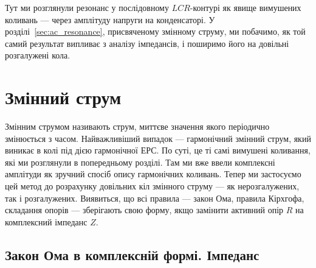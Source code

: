 Тут ми розглянули резонанс у послідовному $LCR$-контурі як явище вимушених коливань --- через амплітуду напруги на конденсаторі. У розділі~\ref{sec:ac_resonance}, присвяченому змінному струму, ми побачимо, як той самий результат випливає з аналізу імпедансів, і поширимо його на довільні розгалужені кола.

\section{Змінний струм}\label{sec:ac}

Змінним струмом називають струм, миттєве значення якого періодично змінюється з часом. Найважливіший випадок --- гармонічний змінний струм, який виникає в колі під дією гармонічної ЕРС. По суті, це ті самі вимушені коливання, які ми розглянули в попередньому розділі. Там ми вже ввели комплексні амплітуди як зручний спосіб опису гармонічних коливань. Тепер ми застосуємо цей метод до розрахунку довільних кіл змінного струму --- як нерозгалужених, так і розгалужених. Виявиться, що всі правила --- закон Ома, правила Кірхгофа, складання опорів --- зберігають свою форму, якщо замінити активний опір $R$ на комплексний імпеданс $Z$.


\subsection*{Закон Ома в комплексній формі. Імпеданс}

